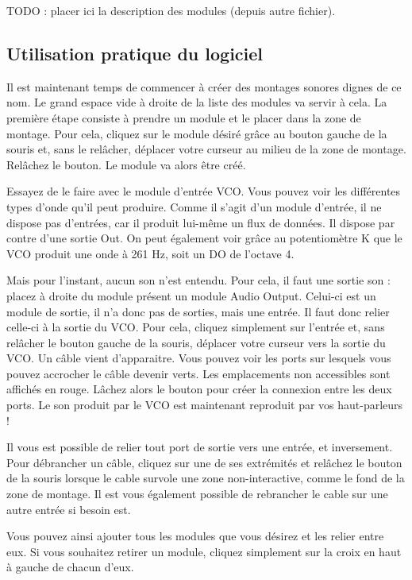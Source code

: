\documentclass[a4paper,oneside,frenchb,12pt]{article}
\begin{document}
TODO : placer ici la description des modules (depuis autre
fichier).

\subsection{Utilisation pratique du logiciel}

Il est maintenant temps de commencer à créer des montages sonores
dignes de ce nom. Le grand espace vide à droite de la liste des
modules va servir à cela. La première étape consiste à prendre un
module et le placer dans la zone de montage. Pour cela, cliquez sur
le module désiré grâce au bouton gauche de la souris et, sans le
relâcher, déplacer votre curseur au milieu de la zone de montage.
Relâchez le bouton. Le module va alors être créé.

Essayez de le faire avec le module d'entrée VCO. Vous pouvez voir
les différentes types d'onde qu'il peut produire. Comme il s'agit
d'un module d'entrée, il ne dispose pas d'entrées, car il produit
lui-même un flux de données. Il dispose par contre d'une sortie
Out. On peut également voir grâce au potentiomètre K que le VCO
produit une onde à 261 Hz, soit un DO de l'octave 4.

Mais pour l'instant, aucun son n'est entendu. Pour cela, il faut
une sortie son : placez à droite du module présent un module Audio
Output. Celui-ci est un module de sortie, il n'a donc pas de
sorties, mais une entrée. Il faut donc relier celle-ci à la sortie
du VCO. Pour cela, cliquez simplement sur l'entrée et, sans
relâcher le bouton gauche de la souris, déplacer votre curseur vers
la sortie du VCO. Un câble vient d'apparaitre. Vous pouvez voir les
ports sur lesquels vous pouvez accrocher le câble devenir verts.
Les emplacements non accessibles sont affichés en rouge. Lâchez
alors le bouton pour créer la connexion entre les deux ports. Le
son produit par le VCO est maintenant reproduit par vos
haut-parleurs !

Il vous est possible de relier tout port de sortie vers une entrée,
et inversement. Pour débrancher un câble, cliquez sur une de ses
extrémités et relâchez le bouton de la souris lorsque le cable
survole une zone non-interactive, comme le fond de la zone de
montage. Il est vous également possible de rebrancher le cable sur
une autre entrée si besoin est.

Vous pouvez ainsi ajouter tous les modules que vous désirez et les
relier entre eux. Si vous souhaitez retirer un module, cliquez
simplement sur la croix en haut à gauche de chacun d'eux.
\end{document}
